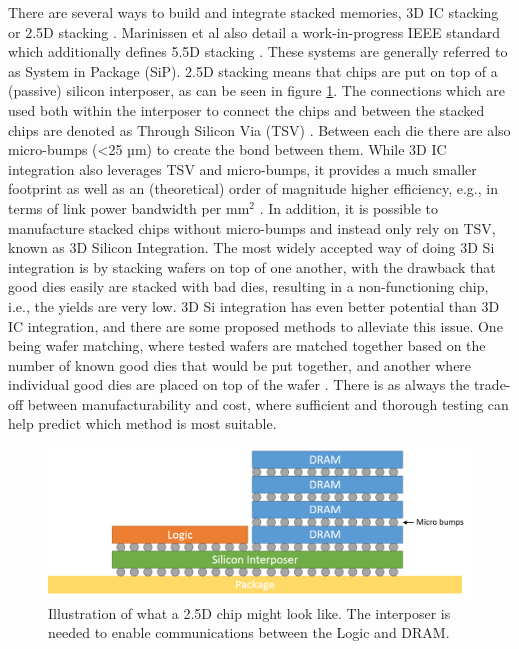 There are several ways to build and integrate stacked memories, 3D IC stacking or 2.5D stacking \cite{6248905}\cite{5702702}\cite{6248842}. Marinissen et al also detail a work-in-progress IEEE standard which additionally defines 5.5D stacking \cite{7519330}. These systems are generally referred to as System in Package (SiP). 2.5D stacking means that chips are put on top of a (passive) silicon interposer, as can be seen in figure \ref{2D-chip}. The connections which are used both within the interposer to connect the chips and between the stacked chips are denoted as Through Silicon Via (TSV) \cite{Lau2018}\cite{lau2012through}. Between each die there are also micro-bumps (<25 µm) to create the bond between them. While 3D IC integration also leverages TSV and micro-bumps, it provides a much smaller footprint as well as an (theoretical) order of magnitude higher efficiency, e.g., in terms of link power bandwidth per mm$^{2}$ \cite{6248968}. In addition, it is possible to manufacture stacked chips without micro-bumps and instead only rely on TSV, known as 3D Silicon Integration. The most widely accepted way of doing 3D Si integration is by stacking wafers on top of one another, with the drawback that good dies easily are stacked with bad dies, resulting in a non-functioning chip, i.e., the yields are very low. 3D Si integration has even better potential than 3D IC integration, and there are some proposed methods to alleviate this issue. One being wafer matching, where tested wafers are matched together based on the number of known good dies that would be put together, and another where individual good dies are placed on top of the wafer \cite{Taouil:2010:TCA:1931472.1931973}. There is as always the trade-off between manufacturability and cost, where sufficient and thorough testing can help predict which method is most suitable.

\begin{figure}[!h]
\centering
\includegraphics[width=0.75\linewidth]{figure/2D-integration.png}
\caption{Illustration of what a 2.5D chip might look like. The interposer is needed to enable communications between the Logic and DRAM. }
\label{2D-chip}
\end{figure}


